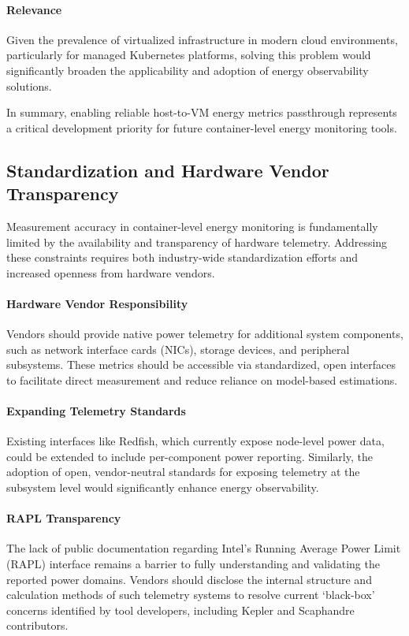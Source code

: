 \paragraph{Relevance}
Given the prevalence of virtualized infrastructure in modern cloud environments, particularly for managed Kubernetes platforms, solving this problem would significantly broaden the applicability and adoption of energy observability solutions.

In summary, enabling reliable host-to-VM energy metrics passthrough represents a critical development priority for future container-level energy monitoring tools.

\subsection{Standardization and Hardware Vendor Transparency}
\label{sec:future-standardization}

Measurement accuracy in container-level energy monitoring is fundamentally limited by the availability and transparency of hardware telemetry. Addressing these constraints requires both industry-wide standardization efforts and increased openness from hardware vendors.

\paragraph{Hardware Vendor Responsibility}
Vendors should provide native power telemetry for additional system components, such as network interface cards (NICs), storage devices, and peripheral subsystems. These metrics should be accessible via standardized, open interfaces to facilitate direct measurement and reduce reliance on model-based estimations.

\paragraph{Expanding Telemetry Standards}
Existing interfaces like Redfish, which currently expose node-level power data, could be extended to include per-component power reporting. Similarly, the adoption of open, vendor-neutral standards for exposing telemetry at the subsystem level would significantly enhance energy observability.

\paragraph{RAPL Transparency}
The lack of public documentation regarding Intel’s Running Average Power Limit (RAPL) interface remains a barrier to fully understanding and validating the reported power domains. Vendors should disclose the internal structure and calculation methods of such telemetry systems to resolve current ‘black-box’ concerns identified by tool developers, including Kepler and Scaphandre contributors.

